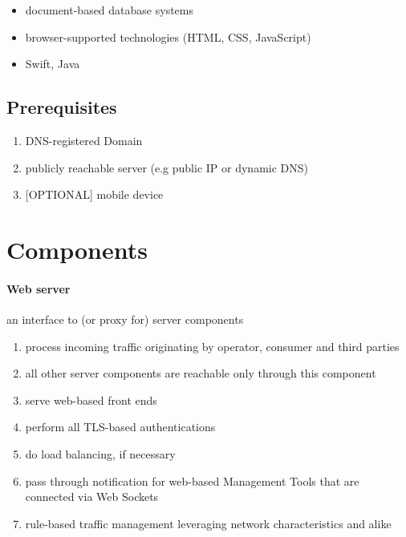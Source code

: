 \documentclass[12pt,english,a4paper,titlepage,cleardoublepage=empty,dottedtoc]{report}
\providecommand{\tightlist}{%
  \setlength{\itemsep}{0pt}\setlength{\parskip}{0pt}}
\begin{document}
\begin{itemize}
\tightlist
\item
  document-based database systems
\item
  browser-supported technologies (HTML, CSS, JavaScript)
\item
  Swift, Java
\end{itemize}

\subsection{Prerequisites}\label{prerequisites}

\begin{enumerate}
\def\labelenumi{\alph{enumi})}
\tightlist
\item
  DNS-registered Domain
\item
  publicly reachable server (e.g public IP or dynamic DNS)
\item
  {[}OPTIONAL{]} mobile device
\end{enumerate}

\section{Components}\label{components}

\paragraph{Web server}\label{web-server-1}

an interface to (or proxy for) server components

\begin{enumerate}
\def\labelenumi{\alph{enumi})}
\tightlist
\item
  process incoming traffic originating by operator, consumer and third
  parties
\item
  all other server components are reachable only through this component
\item
  serve web-based front ends
\item
  perform all TLS-based authentications
\item
  do load balancing, if necessary
\item
  pass through notification for web-based Management Tools that are
  connected via Web Sockets
\item
  rule-based traffic management leveraging network characteristics and
  alike
\end{enumerate}
\end{document}

